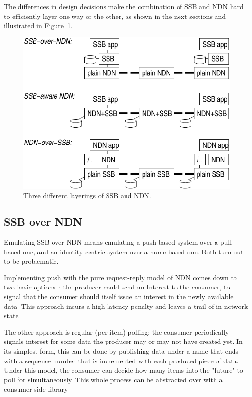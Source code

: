 \documentclass[9pt,sigconf]{acmart}
\begin{document}
The differences in design decisions make the combination of SSB and NDN hard to efficiently layer one way or the other, as shown in the next sections and illustrated in Figure~\ref{fig:ssb-and-ndn}.

\begin{figure}[htb]
  \raggedright
  \includegraphics[width=0.9\columnwidth]{figs/ssb-and-ndn.pdf}
  \caption{\label{fig:ssb-and-ndn}Three different layerings of SSB and NDN.}
\end{figure}

\subsection{SSB over NDN}
\label{ssect:ssb-over-ndn}

Emulating SSB over NDN means emulating a push-based system over a pull-based one, and an identity-centric system over a name-based one. Both turn out to be problematic.

Implementing push with the pure request-reply model of NDN comes down to two basic options~\cite{carzaniga2011pubsub}: the producer could send an Interest to the consumer, to signal that the consumer should itself issue an interest in the newly available data. This approach incurs a high latency penalty and leaves a trail of in-network state.

The other approach is regular (per-item) polling: the consumer periodically signals interest for some data the producer may or may not have created yet. In its simplest form, this can be done by publishing data under a name that ends with a sequence number that is incremented with each produced piece of data. Under this model, the consumer can decide how many items into the "future" to poll for simultaneously. This whole process can be abstracted over with a consumer-side library~\cite{moiseenko2014consumer,sardara2018transport}.
\end{document}
